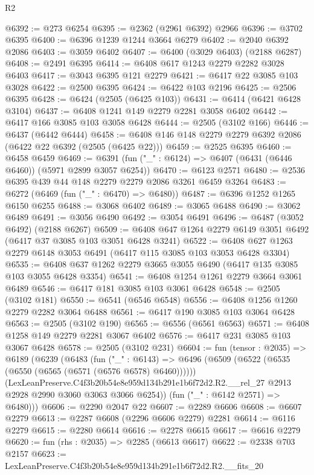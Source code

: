 \begin{lexlean}{R2}
\begin{coremodule}
@6392 := @273 @6254
@6395 := @2362 (@2961 @6392) @2966
@6396 := @3702 @6395
@6400 := @6396 @1239 @1244 @3664 @6279
@6402 := @2040 @6392 @2086
@6403 := @3059 @6402
@6407 := @6400 (@3029 @6403) (@2188 @6287)
@6408 := @2491 @6395
@6414 := @6408 @617 @1243 @2279 @2282 @3028 @6403
@6417 := @3043 @6395 @121 @2279
@6421 := @6417 @22 @3085 @103 @3028
@6422 := @2500 @6395
@6424 := @6422 @103 @2196
@6425 := @2506 @6395
@6428 := @6424 (@2505 (@6425 @103))
@6431 := @6414 (@6421 @6428 @3104)
@6437 := @6408 @1241 @149 @2279 @2281 @3058 @6402
@6442 := @6417 @166 @3085 @103 @3058 @6428
@6444 := @2505 (@3102 @166)
@6446 := @6437 (@6442 @6444)
@6458 := @6408 @146 @148 @2279 @2279 @6392 @2086 (@6422 @22 @6392 (@2505 (@6425 @22)))
@6459 := @2525 @6395
@6460 := @6458 @6459
@6469 := @6391 (fun ("_" : @6124) => @6407 (@6431 (@6446 @6460)) (@5971 @2899 @3057 @6254))
@6470 := @6123 @2571
@6480 := @2536 @6395 @439 @44 @148 @2279 @2279 @2086 @3261 @6459 @3264
@6483 := @6272 (@6469 (fun ("_" : @6470) => @6480))
@6487 := @6396 @1252 @1265 @6150 @6255
@6488 := @3068 @6402
@6489 := @3065 @6488
@6490 := @3062 @6489
@6491 := @3056 @6490
@6492 := @3054 @6491
@6496 := @6487 (@3052 @6492) (@2188 @6267)
@6509 := @6408 @647 @1264 @2279 @6149 @3051 @6492 (@6417 @37 @3085 @103 @3051 @6428 @3241)
@6522 := @6408 @627 @1263 @2279 @6148 @3053 @6491 (@6417 @115 @3085 @103 @3053 @6428 @3304)
@6535 := @6408 @637 @1262 @2279 @3665 @3055 @6490 (@6417 @135 @3085 @103 @3055 @6428 @3354)
@6541 := @6408 @1254 @1261 @2279 @3664 @3061 @6489
@6546 := @6417 @181 @3085 @103 @3061 @6428
@6548 := @2505 (@3102 @181)
@6550 := @6541 (@6546 @6548)
@6556 := @6408 @1256 @1260 @2279 @2282 @3064 @6488
@6561 := @6417 @190 @3085 @103 @3064 @6428
@6563 := @2505 (@3102 @190)
@6565 := @6556 (@6561 @6563)
@6571 := @6408 @1258 @149 @2279 @2281 @3067 @6402
@6576 := @6417 @231 @3085 @103 @3067 @6428
@6578 := @2505 (@3102 @231)
@6604 := fun (tensor : @2035) =>
  @6189
    (@6239
      (@6483
        (fun ("_" : @6143) =>
        @6496
          (@6509 (@6522 (@6535 (@6550 (@6565 (@6571 (@6576 @6578) @6460))))))
          (LexLeanPreserve.C4f3b20b54e8e959d134b291e1b6f72d2.R2.__rel_27
            @2913
            @2928
            @2990
            @3060
            @3063
            @3066
            @6254))
        (fun ("_" : @6142 @2571) => @6480)))
@6606 := @2290 @2047 @22
@6607 := @2289 @6606
@6608 := @6607 @2279
@6613 := @2287 @6608 (@2296 @6606 @2279) @2281
@6614 := @6116 @2279
@6615 := @2280 @6614
@6616 := @2278 @6615
@6617 := @6616 @2279
@6620 := fun (rhs : @2035) => @2285 (@6613 @6617)
@6622 := @2338 @703 @2157
@6623 := LexLeanPreserve.C4f3b20b54e8e959d134b291e1b6f72d2.R2.__fits_20

\end{coremodule}
\end{lexlean}

